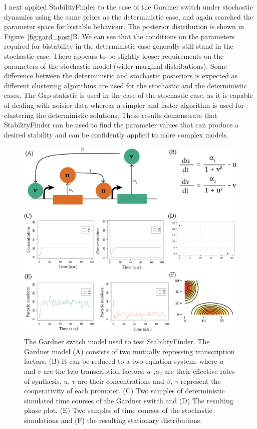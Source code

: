 I next applied StabilityFinder to the case of the Gardner switch under stochastic dynamics using the same priors as the deterministic case, and again searched the parameter space for bistable behaviour. The posterior distribution is shown in Figure~\ref{fig:gard_post}B. We can see that the conditions on the parameters required for bistability in the deterministic case generally still stand in the stochastic case. There appears to be slightly looser requirements on the parameters of the stochastic model (wider marginal distributions). Some difference between the deterministic and stochastic posteriors is expected as different clustering algorithms are used for the stochastic and the deterministic cases. The Gap statistic is used in the case of the stochastic case, as it is capable of dealing with noisier data whereas a simpler and faster algorithm is used for clustering the deterministic solutions. These results demonstrate that StabilityFinder can be used to find the parameter values that can produce a desired stability and can be confidently applied to more complex models.


\begin{figure}[htbp]
\begin{center}
	\includegraphics[scale=0.8]{../../chapters/chapterStabilityFinder/images/gardner_model.png}
	\caption[StabilityFinder used on the Gardner toggle switch]{\label{fig:gard_mod} The Gardner switch model used to test StabilityFinder. The Gardner model (A) consists of two mutually repressing transcription factors. (B) It can be reduced to a two-equation system, where $u$ and $v$ are the two transcription factors, $a_1$,$a_2$ are their effective rates of synthesis, $u$, $v$ are their concentrations and $\beta$, $\gamma$ represent the cooperativity of each promoter. (C) Two samples of deterministic simulated time courses of the Gardner switch and (D) The resulting phase plot. (E) Two samples of time courses of the stochastic simulations and (F) the resulting stationary distributions.}
\end{center}
\end{figure}

